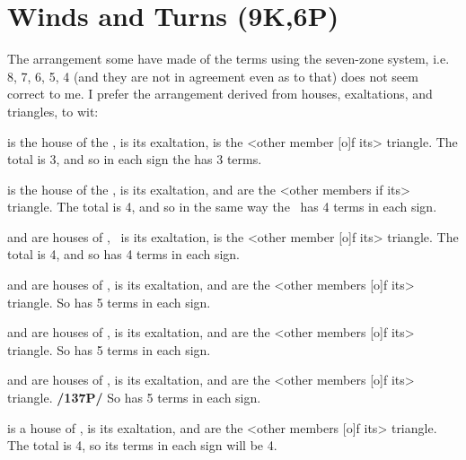 \section{Winds and Turns (9K,6P)}

The arrangement some have made of the terms using the seven-zone system, i.e. 8, 7, 6, 5, 4 (and they are not in agreement even as to that) does not seem correct to me. I prefer the arrangement derived from houses, exaltations, and triangles, to wit:

\Leo\xspace is the house of the \Sun, \Aries\xspace is its exaltation, \Sagittarius\xspace is the <other member [o]f its> triangle. The total is 3, and so in each sign the \Sun\xspace has 3 terms.

\Cancer\xspace is the house of the \Moon, \Taurus\xspace is its exaltation, \Virgo\xspace and \Capricorn\xspace are the <other members if its> triangle. The total is 4, and so in the same way the \Moon\, has 4 terms in each sign.

\Capricorn\xspace and \Aquarius\xspace are houses of \Saturn, \Libra\, is its exaltation, \Gemini\xspace is the <other member [o]f its> triangle. The total is 4, and so \Saturn\xspace has 4 terms in each sign.

\Sagittarius\xspace and \Pisces\xspace are houses of \Jupiter, \Cancer\xspace is its exaltation, \Aries\xspace and \Leo\xspace are the <other members [o]f its> triangle. So \Jupiter\xspace has 5 terms in each sign.

\Aries\xspace and \Scorpio\xspace are houses of \Mars, \Capricorn\xspace is its exaltation, \Pisces\xspace and \Cancer\xspace are the <other members [o]f its> triangle. So \Mars\xspace has 5 terms in each sign.

\Taurus\xspace and \Libra\xspace are houses of \Venus, \Pisces\xspace is its exaltation, \Virgo\xspace and \Capricorn\xspace are the <other members [o]f its> triangle. \textbf{/137P/} So \Venus\xspace has 5 terms in each sign.

\Gemini\xspace is a house of \Mercury, \Virgo\xspace is its exaltation, \Aquarius\xspace and \Libra\xspace are the <other members [o]f its> triangle. The total is 4, so its terms in each sign will be 4.
\newpage

